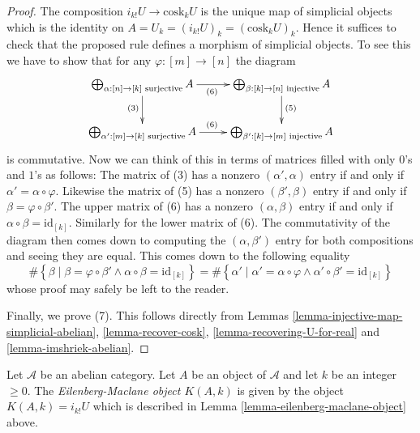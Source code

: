 \begin{proof}
\medskip\noindent
The composition $i_{k!}U \to \text{cosk}_kU$ is the
unique map of simplicial objects which is
the identity on $A = U_k = (i_{k!}U)_k = (\text{cosk}_kU)_k$.
Hence it suffices to check that the proposed rule defines
a morphism of simplicial objects.
To see this we have to show that
for any $\varphi : [m] \to [n]$ the diagram
$$
\xymatrix{
\bigoplus_{\alpha : [n] \to [k]\text{ surjective}} A
\ar[d]_{(3)}
\ar[r]_{(6)}
&
\bigoplus_{\beta : [k] \to [n]\text{ injective}} A
\ar[d]^{(5)}
\\
\bigoplus_{\alpha' : [m] \to [k]\text{ surjective}} A
\ar[r]^{(6)}
& 
\bigoplus_{\beta' : [k] \to [m]\text{ injective}} A
}
$$
is commutative. Now we can think of this in terms of
matrices filled with only $0$'s and $1$'s as follows:
The matrix of (3) has a nonzero
$(\alpha', \alpha)$ entry if and only if
$\alpha' = \alpha \circ \varphi$. Likewise
the matrix of (5) has a nonzero
$(\beta', \beta)$ entry if and only if
$\beta = \varphi \circ \beta'$. The upper matrix
of (6) has a nonzero $(\alpha, \beta)$ entry if and only if
$\alpha \circ \beta = \text{id}_{[k]}$. Similarly for the
lower matrix of (6). The commutativity of the
diagram then comes down to computing the
$(\alpha, \beta')$ entry for both compositions
and seeing they are equal. This comes down to the
following equality
$$
\# \left\{
\beta
\mid
\beta = \varphi \circ \beta' \wedge \alpha \circ \beta = \text{id}_{[k]}
\right\}
=
\# \left\{
\alpha'
\mid
\alpha' = \alpha \circ \varphi \wedge \alpha' \circ \beta' = \text{id}_{[k]}
\right\}
$$
whose proof may safely be left to the reader.

\medskip\noindent
Finally, we prove (7). This follows directly from
Lemmas \ref{lemma-injective-map-simplicial-abelian},
\ref{lemma-recover-cosk}, \ref{lemma-recovering-U-for-real}
and \ref{lemma-imshriek-abelian}.
\end{proof}

\begin{definition}
\label{defintition-eilenberg-maclane}
Let $\mathcal{A}$ be an abelian category.
Let $A$ be an object of $\mathcal{A}$ and
let $k$ be an integer $\geq 0$.
The {\it Eilenberg-Maclane object $K(A, k)$}
is given by the object $K(A, k) = i_{k!}U$
which is described in
Lemma \ref{lemma-eilenberg-maclane-object} above.
\end{definition}


